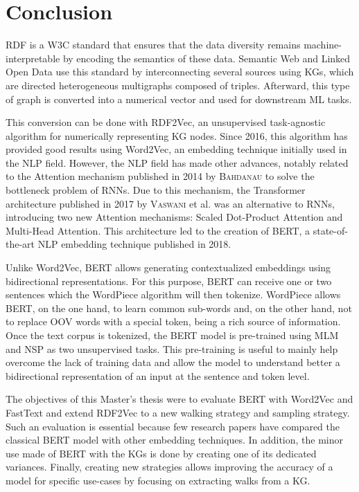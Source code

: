 
\chapter{Conclusion}
\label{chap:conclusion}

RDF is a W3C standard that ensures that the data diversity remains
machine-interpretable by encoding the semantics of these data. Semantic Web and
Linked Open Data use this standard by interconnecting several sources using KGs,
which are directed heterogeneous multigraphs composed of triples. Afterward,
this type of graph is converted into a numerical vector and used for downstream
ML tasks.

This conversion can be done with RDF2Vec, an unsupervised task-agnostic
algorithm for numerically representing KG nodes. Since 2016, this algorithm has
provided good results using Word2Vec, an embedding technique initially used in
the NLP field. However, the NLP field has made other advances, notably related
to the Attention mechanism published in 2014 by \textsc{Bahdanau} to solve the
bottleneck problem of RNNs. Due to this mechanism, the Transformer architecture
published in 2017 by \textsc{Vaswani} et al. was an alternative to RNNs,
introducing two new Attention mechanisms: Scaled Dot-Product Attention and
Multi-Head Attention. This architecture led to the creation of BERT, a
state-of-the-art NLP embedding technique published in 2018.

Unlike Word2Vec, BERT allows generating contextualized embeddings using
bidirectional representations. For this purpose, BERT can receive one or two
sentences which the WordPiece algorithm will then tokenize. WordPiece allows
BERT, on the one hand, to learn common sub-words and, on the other hand, not to
replace OOV words with a special token, being a rich source of information. Once
the text corpus is tokenized, the BERT model is pre-trained using MLM and NSP as
two unsupervised tasks. This pre-training is useful to mainly help overcome the
lack of training data and allow the model to understand better a bidirectional
representation of an input at the sentence and token level.

The objectives of this Master's thesis were to evaluate BERT with Word2Vec and
FastText and extend RDF2Vec to a new walking strategy and sampling
strategy. Such an evaluation is essential because few research papers have
compared the classical BERT model with other embedding techniques. In addition,
the minor use made of BERT with the KGs is done by creating one of its dedicated
variances. Finally, creating new strategies allows improving the accuracy of a
model for specific use-cases by focusing on extracting walks from a KG.

